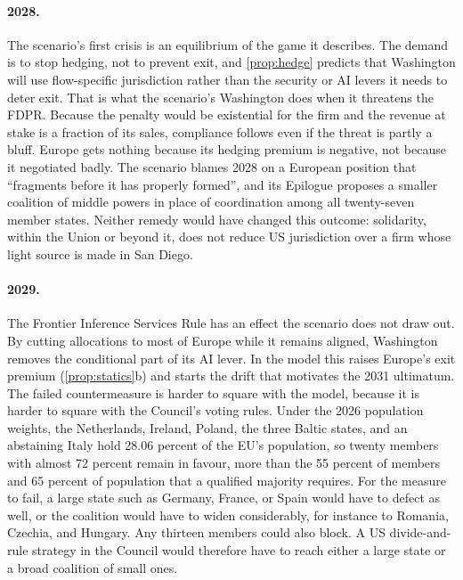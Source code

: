 \paragraph{2028.} The scenario's first crisis is an equilibrium of the game it describes. The demand is to stop hedging, not to prevent exit, and \cref{prop:hedge} predicts that Washington will use flow-specific jurisdiction rather than the security or AI levers it needs to deter exit. That is what the scenario's Washington does when it threatens the FDPR. Because the penalty would be existential for the firm and the revenue at stake is a fraction of its sales, compliance follows even if the threat is partly a bluff. Europe gets nothing because its hedging premium is negative, not because it negotiated badly. The scenario blames 2028 on a European position that ``fragments before it has properly formed'', and its Epilogue proposes a smaller coalition of middle powers in place of coordination among all twenty-seven member states. Neither remedy would have changed this outcome: solidarity, within the Union or beyond it, does not reduce US jurisdiction over a firm whose light source is made in San Diego.

\paragraph{2029.} The Frontier Inference Services Rule has an effect the scenario does not draw out. By cutting allocations to most of Europe while it remains aligned, Washington removes the conditional part of its AI lever. In the model this raises Europe's exit premium (\cref{prop:statics}b) and starts the drift that motivates the 2031 ultimatum. The failed countermeasure is harder to square with the model, because it is harder to square with the Council's voting rules. Under the 2026 population weights, the Netherlands, Ireland, Poland, the three Baltic states, and an abstaining Italy hold 28.06 percent of the EU's population, so twenty members with almost 72 percent remain in favour, more than the 55 percent of members and 65 percent of population that a qualified majority requires. For the measure to fail, a large state such as Germany, France, or Spain would have to defect as well, or the coalition would have to widen considerably, for instance to Romania, Czechia, and Hungary. Any thirteen members could also block. A US divide-and-rule strategy in the Council would therefore have to reach either a large state or a broad coalition of small ones.

